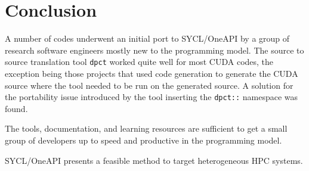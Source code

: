 
\section{Conclusion}\label{sec:conclusion}
A number of codes underwent an initial port to SYCL/OneAPI by a group of research software engineers mostly new to the programming model.
The source to source translation tool \texttt{dpct} worked quite well for most CUDA codes, the exception being those projects that used code generation to generate the CUDA source where the tool needed to be run on the generated source.
A solution for the portability issue introduced by the tool inserting the \texttt{dpct::} namespace was found.

The tools, documentation, and learning resources are sufficient to get a small group of developers up to speed and productive in the programming model.

SYCL/OneAPI presents a feasible method to target heterogeneous HPC systems.
